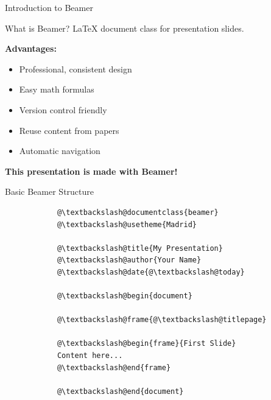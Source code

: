 \documentclass[aspectratio=169]{beamer}
\begin{document}
	\begin{frame}{Introduction to Beamer}
		\begin{block}{What is Beamer?}
			LaTeX document class for presentation slides.
		\end{block}
		
		\vspace{1em}
		
		\textbf{Advantages:}
		\begin{itemize}
			\item Professional, consistent design
			\item Easy math formulas
			\item Version control friendly
			\item Reuse content from papers
			\item Automatic navigation
		\end{itemize}
		
		\vspace{1em}
		
		\textbf{This presentation is made with Beamer!}
	\end{frame}
	
	\begin{frame}[fragile]{Basic Beamer Structure}
		\begin{lstlisting}
			@\textbackslash@documentclass{beamer}
			@\textbackslash@usetheme{Madrid}
			
			@\textbackslash@title{My Presentation}
			@\textbackslash@author{Your Name}
			@\textbackslash@date{@\textbackslash@today}
			
			@\textbackslash@begin{document}
			
			@\textbackslash@frame{@\textbackslash@titlepage}
			
			@\textbackslash@begin{frame}{First Slide}
			Content here...
			@\textbackslash@end{frame}
			
			@\textbackslash@end{document}
		\end{lstlisting}
	\end{frame}
	
\end{document}

